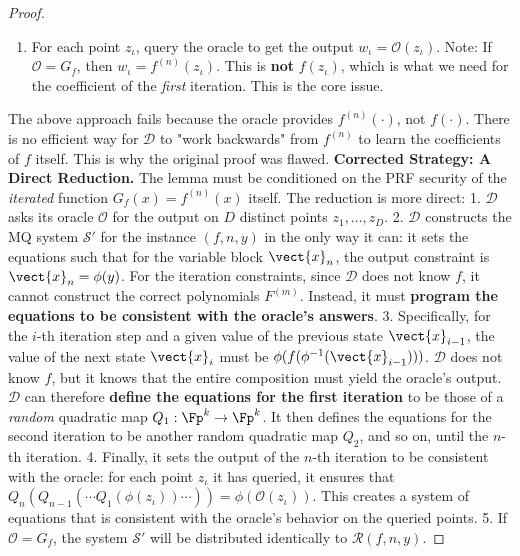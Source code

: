 \begin{proof}
\begin{enumerate}
\begin{enumerate}
                            \item For each point $z_\iota$, query the oracle to get the output $w_\iota = \mathcal{O}(z_\iota)$. Note: If $\mathcal{O} = G_f$, then $w_\iota = f^{(n)}(z_\iota)$. This is \textbf{not} $f(z_\iota)$, which is what we need for the coefficient of the \textit{first} iteration. This is the core issue.
                        \end{enumerate}
                    \end{enumerate}
                The above approach fails because the oracle provides $f^{(n)}(\cdot)$, not $f(\cdot)$. There is no efficient way for $\mathcal{D}$ to "work backwards" from $f^{(n)}$ to learn the coefficients of $f$ itself. This is why the original proof was flawed.
                \textbf{Corrected Strategy: A Direct Reduction.}
                The lemma must be conditioned on the PRF security of the \textit{iterated} function $G_f(x) = f^{(n)}(x)$ itself. The reduction is more direct:
                1.  $\mathcal{D}$ asks its oracle $\mathcal{O}$ for the output on $D$ distinct points $z_1, \ldots, z_D$.
                2.  $\mathcal{D}$ constructs the MQ system $\mathcal{S}'$ for the instance $(f, n, y)$ in the only way it can: it sets the equations such that for the variable block $\vect{x}_n$, the output constraint is $\vect{x}_n = \phi(y)$. For the iteration constraints, since $\mathcal{D}$ does not know $f$, it cannot construct the correct polynomials $F^{(m)}$. Instead, it must \textbf{program the equations to be consistent with the oracle's answers}.
                3.  Specifically, for the $i$-th iteration step and a given value of the previous state $\vect{x}_{i-1}$, the value of the next state $\vect{x}_i$ must be $\phi(f(\phi^{-1}(\vect{x}_{i-1})))$. $\mathcal{D}$ does not know $f$, but it knows that the entire composition must yield the oracle's output. $\mathcal{D}$ can therefore \textbf{define the equations for the first iteration} to be those of a \textit{random} quadratic map $Q_1: \Fp^k \to \Fp^k$. It then defines the equations for the second iteration to be another random quadratic map $Q_2$, and so on, until the $n$-th iteration.
                4.  Finally, it sets the output of the $n$-th iteration to be consistent with the oracle: for each point $z_\iota$ it has queried, it ensures that $Q_n(Q_{n-1}(\cdots Q_1(\phi(z_\iota))\cdots)) = \phi(\mathcal{O}(z_\iota))$. This creates a system of equations that is consistent with the oracle's behavior on the queried points.
                5.  If $\mathcal{O} = G_f$, the system $\mathcal{S}'$ will be distributed identically to $\mathcal{R}(f, n, y)$.

\end{proof}
